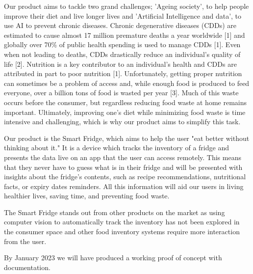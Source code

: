 Our product aims to tackle two grand challenges;  
'Ageing society', to help people improve their diet and live longer lives and  
'Artificial Intelligence and data', to use AI to prevent chronic diseases.  
Chronic degenerative diseases (CDDs) are estimated to cause almost 17 million premature deaths a year worldwide [1] and  
globally over 70\% of public health spending is used to manage CDDs [1].  
Even when not leading to deaths, CDDs drastically reduce an individual's quality of life [2].  
Nutrition is a key contributor to an individual's health and CDDs are attributed in part to poor nutrition [1].  
Unfortunately, getting proper nutrition can sometimes be a problem of access and, 
while enough food is produced to feed everyone, over a billion tons of food is wasted per year [3]. 
Much of this waste occurs before the consumer, but regardless reducing food waste at home remains important. 
Ultimately, improving one's diet while minimizing food waste is time intensive and challenging, 
which is why our product aims to simplify this task.  
 
Our product is the Smart Fridge, which aims to help the user "eat better without thinking about it."  
It is a device which tracks the inventory of a fridge and presents the data live on an app that the user can access remotely.  
This means that they never have to guess what is in their fridge and will be presented with insights about the fridge's contents,  
such as recipe recommendations, nutritional facts, or expiry dates reminders. 
All this information will aid our users in living healthier lives, saving time, and preventing food waste.  

The Smart Fridge stands out from other products on the market as using computer vision to automatically track the inventory 
has not been explored in the consumer space and other food inventory systems require more interaction from the user.  

By January 2023 we will have produced a working proof of concept with documentation. 
